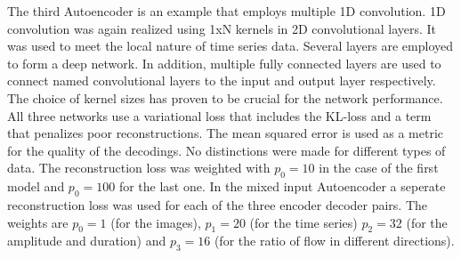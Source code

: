 The third Autoencoder is an example that employs multiple 1D convolution. 1D convolution was again realized using 1xN kernels in 2D convolutional layers. It was used to meet the local nature of time series data. Several layers are employed to form a deep network. In addition, multiple fully connected layers are used to connect named convolutional layers to the input and output layer respectively. The choice of kernel sizes has proven to be crucial for the network performance.\\
All three networks use a variational loss that includes the KL-loss and a term that penalizes poor reconstructions. The mean squared error is used as a metric for the quality of the decodings. No distinctions were made for different types of data. The reconstruction loss was weighted with $p_0=10$ in the case of the first model and $p_0=100$ for the last one. In the mixed input Autoencoder a seperate reconstruction loss was used for each of the three encoder decoder pairs. The weights are $p_0=1$ (for the images), $p_1=20$ (for the time series) $p_2=32$ (for the amplitude and duration) and $p_3=16$ (for the ratio of flow in different directions).

